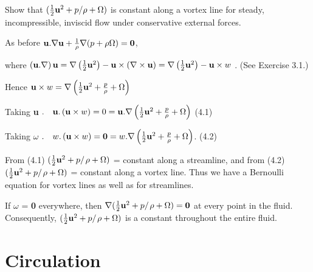 \documentclass[10pt]{report}
\begin{document}
\begin{examplebox}
Show that $(\textstyle{1 \over 2}{{\bf u}}^2+p/ \rho +\Omega
)$ is constant along a vortex line for steady, incompressible, inviscid flow
under conservative external forces.

\begin{examplesolution4}
	As before ${{\bf u}}. \nabla {{\bf u}}+\frac{1}{\rho
	}\nabla (p+\rho \Omega )={{\bf 0}}$,

	where $\left( {{{\bf u}}. \nabla } \right){{\bf u}}=\nabla
	\left( {\textstyle{1 \over 2}{{\bf u}}^2} \right)-{{\bf u}}\times
	\left( {\nabla \times {{\bf u}}} \right)=\nabla \left( {\textstyle{1
	\over 2}{{\bf u}}^2} \right)-{{\bf u}}\times w$ . (See Exercise
	3.1.)

	Hence ${{\bf u}}\times w=\nabla \left( {\textstyle{1 \over 2}{\rm
	{\bf u}}^2+\frac{p}{\rho }+\Omega } \right)$

	Taking \textbf{u }$.  \quad {{\bf u}}. \left( {{{\bf u}}\times
	w} \right)=0={{\bf u}}. \nabla \left( {\textstyle{1 \over 2}{\rm
	{\bf u}}^2+\frac{p}{\rho }+\Omega } \right)$ (4.1)

	Taking \textbf{$\omega $ }$.  \quad w. \left( {{{\bf u}}\times w}
	\right)={{\bf 0}}=w. \nabla \left( {\textstyle{1 \over 2}{\rm
	{\bf u}}^2+\frac{p}{\rho }+\Omega } \right)$. (4.2)

	From (4.1) $(\textstyle{1 \over 2}{{\bf u}}^2+p \mathord{\left/
	{\vphantom {p \rho }} \right. } \rho +\Omega
	)$ = constant along a streamline, and from (4.2) $(\textstyle{1 \over
	2}{{\bf u}}^2+p \mathord{\left/ {\vphantom {p \rho }} \right.
	} \rho +\Omega )$ = constant along a vortex
	line. Thus we have a Bernoulli equation for vortex lines as well as for
	streamlines.

	If \textbf{$\omega $ }= \textbf{0} everywhere, then $\nabla (\textstyle{1
	\over 2}{{\bf u}}^2+p \mathord{\left/ {\vphantom {p \rho }} \right.
	} \rho +\Omega )={{\bf 0}}$ at every
	point in the fluid. Consequently, $(\textstyle{1 \over 2}{{\bf
	u}}^2+p \mathord{\left/ {\vphantom {p \rho }} \right.
	} \rho +\Omega )$ is a constant throughout
	the entire fluid.
\end{examplesolution4}
\end{examplebox}


\section{Circulation}
\label{subsec:circulation}
\end{document}
